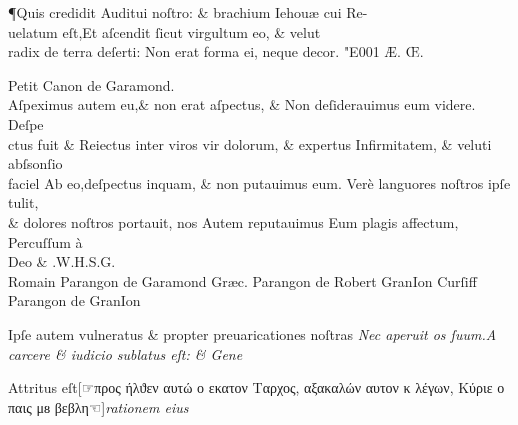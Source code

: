 \documentclass[]{article}
\begin{document}
\centering
{}
\justifying
\huge
\noindent \P \quad Quis credidit Auditui noſtro: \& brachium Iehou\ae{} cui Re-\\
uelatum eſt,Et aſcendit ſicut virgultum  eo, \& velut\\
radix de terra deſerti: Non erat forma ei, neque decor. \char"E001{} \AE{}. \OE .

\small
\centering
Petit Canon de Garamond.\\
\vspace{-0.5\baselineskip}
\Large
\justifying
Aſpeximus autem eu,\& non erat aſpectus, \& Non deſiderauimus eum videre. Deſpe \\
ctus fuit \& Reiectus inter viros vir dolorum, \& expertus Infirmitatem, \& veluti abſsonſio \\
faciel Ab eo,deſpectus inquam, \& non putauimus eum. Ver\`e languores noſtros ipſe tulit, \\
\& dolores noſtros portauit, nos Autem reputauimus Eum plagis affectum, Percuſſum \`a\\
\centering
Deo \& .\quad  W.\quad H.\quad S.\quad G.\quad \\
\tiny
\hfill Romain Parangon de Garamond \hfill Gr\ae{}c. Parangon de Robert GranIon \hfill Curſiff Parangon de GranIon \hspace*{\fill}
\scriptsize
\vspace*{-\baselineskip}
\begin{multicols}{2}
	\justifying
	\normalsize
	\justifying
	Ipſe autem vulneratus \& propter preuaricationes noſtras\newline
	\columnbreak
	\textit{Nec aperuit os ſuum.A carcere \& iudicio sublatus eſt: \& Gene}
\end{multicols}
\vspace{-1.55\baselineskip}
\normalsize
\justifying
\noindent
Attritus eſt\hfill[\hfill☞\hfill προς  ήλϑεν  αυτώ  ο εκατον Ταρχος,  αξακαλών αυτον κ λέγων, Κύριε ο  παις μᴕ βεβλη\hfill ☜\hfill ]\hfill \textit{rationem eius}
\vspace{-1.05\baselineskip}
\end{document}
